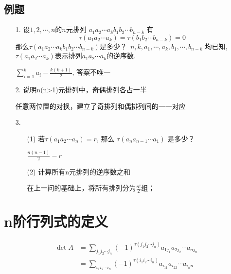 \subsection*{例题}
\begin{itemize}
    \item[1.] 设$1,2,\cdots,n$的$n$元排列
    $a_1a_2\cdots a_k b_1b_2\cdots b_{n-k}$
    有$$\tau(a_1a_2\cdots a_k) = \tau(b_1b_2\cdots b_{n-k}) = 0$$
    那么$\tau(a_1a_2\cdots a_k b_1b_2\cdots b_{n-k})$是多少？
    \,$n,k,a_1,\cdots,a_k, b_1, \cdots, b_{n-k}$
    均已知,\,$\tau(a_1a_2\cdots a_k)$表示排列$a_1a_2\cdots a_k$的逆序数.
	\begin{solution}
		$\sum_{i=1}^k a_i - \frac{k(k+1)}{2}$, 答案不唯一
	\end{solution}
    \vspace{2cm}

    \item[2.] 说明n(n>1)元排列中，奇偶排列各占一半
	\begin{solution}
		任意两位置的对换，建立了奇排列和偶排列间的一一对应
	\end{solution}
    \vspace{1.5cm}

    \item[3.]
    \begin{itemize}
        \item[(1)] 若$\tau(a_1a_2\cdots a_n) = r$, 那么
        $\tau(a_na_{n-1}\cdots a_1)$ 是多少？
		\begin{solution}
			$\frac{n(n-1)}{2} - r$
		\end{solution}
        \vspace{1.5cm}
        \item[(2)] 计算所有n元排列的逆序数之和
		\begin{solution}
			在上一问的基础上，将所有排列分为$\frac{n!}{2}$组；
		\end{solution}
        \vspace{1.5cm}
    \end{itemize} 
\end{itemize}

\section{n阶行列式的定义}
\begin{equation}
\nonumber
\begin{aligned}
\det{A} &= \sum_{j_1 j_2\cdots j_n} (-1)^{\tau(j_1 j_2\cdots j_n)}a_{1j_1}a_{2j_2}\cdots a_{nj_n}\\
        &= \sum_{i_1 i_2\cdots i_n} (-1)^{\tau(i_1 i_2\cdots i_n)}a_{i_11}a_{i_22}\cdots a_{i_nn}
\end{aligned}
\end{equation}

